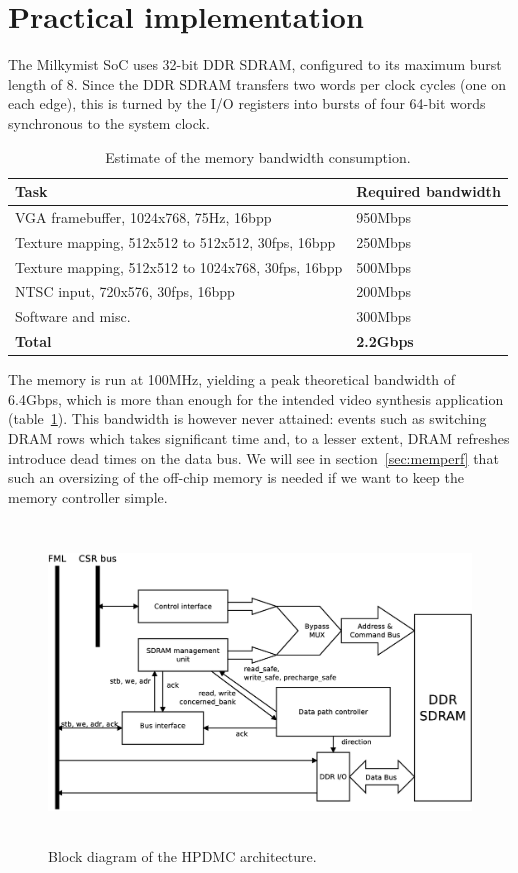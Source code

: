 \documentclass[a4paper,11pt]{kthesis}
\begin{document}
\section{Practical implementation}
\label{sec:memimpl}
The Milkymist SoC uses 32-bit DDR SDRAM, configured to its maximum burst length of 8. Since the DDR SDRAM transfers two words per clock cycles (one on each edge), this is turned by the I/O registers into bursts of four 64-bit words synchronous to the system clock.

\begin{table}
\centering
\begin{tabular}{|l|l|}
\hline
\textbf{Task} & \textbf{Required bandwidth} \\
\hline
VGA framebuffer, 1024x768, 75Hz, 16bpp & 950Mbps \\
\hline
Texture mapping, 512x512 to 512x512, 30fps, 16bpp & 250Mbps \\
\hline
Texture mapping, 512x512 to 1024x768, 30fps, 16bpp & 500Mbps \\
\hline
NTSC input, 720x576, 30fps, 16bpp & 200Mbps \\
\hline
Software and misc. & 300Mbps \\
\hline
\textbf{Total} & \textbf{2.2Gbps} \\
\hline
\end{tabular}
\label{tab:membw}
\caption{Estimate of the memory bandwidth consumption.}
\end{table}

The memory is run at 100MHz, yielding a peak theoretical bandwidth of 6.4Gbps, which is more than enough for the intended video synthesis application (table~\ref{tab:membw}). This bandwidth is however never attained: events such as switching DRAM rows which takes significant time and, to a lesser extent, DRAM refreshes introduce dead times on the data bus. We will see in section~\ref{sec:memperf} that such an oversizing of the off-chip memory is needed if we want to keep the memory controller simple.

\begin{figure}[H]
\centering
\includegraphics[height=85mm]{hpdmc_block.eps}
\caption{Block diagram of the HPDMC architecture.}\label{fig:hpdmc_block}
\end{figure}
\end{document}
